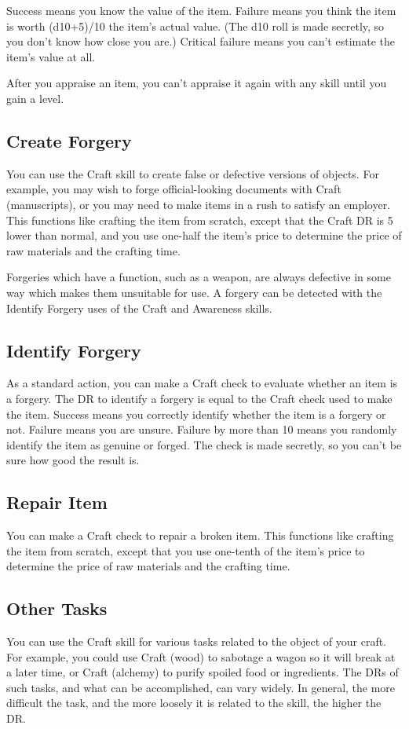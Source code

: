         Success means you know the value of the item. Failure means you think the item is worth (d10+5)/10 \x the item's actual value. (The d10 roll is made secretly, so you don't know how close you are.) Critical failure means you can't estimate the item's value at all.

        After you appraise an item, you can't appraise it again with any skill until you gain a level.

    \subsection{Create Forgery}
        You can use the Craft skill to create false or defective versions of objects. For example, you may wish to forge official-looking documents with Craft (manuscripts), or you may need to make items in a rush to satisfy an employer. This functions like crafting the item from scratch, except that the Craft DR is 5 lower than normal, and you use one-half the item's price to determine the price of raw materials and the crafting time.

        Forgeries which have a function, such as a weapon, are always defective in some way which makes them unsuitable for use. A forgery can be detected with the Identify Forgery uses of the Craft and Awareness skills.

    \subsection{Identify Forgery}
        As a standard action, you can make a Craft check to evaluate whether an item is a forgery. The DR to identify a forgery is equal to the Craft check used to make the item. Success means you correctly identify whether the item is a forgery or not. Failure means you are unsure. Failure by more than 10 means you randomly identify the item as genuine or forged. The check is made secretly, so you can't be sure how good the result is.

    \subsection{Repair Item}
        You can make a Craft check to repair a broken item. This functions like crafting the item from scratch, except that you use one-tenth of the item's price to determine the price of raw materials and the crafting time.

    \subsection{Other Tasks}
        You can use the Craft skill for various tasks related to the object of your craft. For example, you could use Craft (wood) to sabotage a wagon so it will break at a later time, or Craft (alchemy) to purify spoiled food or ingredients. The DRs of such tasks, and what can be accomplished, can vary widely. In general, the more difficult the task, and the more loosely it is related to the skill, the higher the DR\@.

